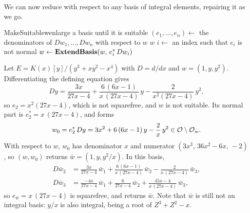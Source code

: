 We can now reduce with respect to any basis of integral elements, repairing it
as we go.

\begin{algo}{MakeSuitable}{w}{enlarge a basis until it is suitable}
\Loop
  \State $(e_1, \dots, e_n) \gets$ the denominators of $Dw_1, \dots, Dw_n$ with respect to $w$
   \Return $w$ \EndIf
  \State $i \gets$ an index such that $e_i$ is not normal
  \State $w \gets \textbf{ExtendBasis}(w,\, e_i^*\, Dw_i)$ 
\EndLoop
\end{algo}

\begin{example}\label{ex:make-suitable}
Let $E = K(x)[y]/(y^3 + x y^2 - x^4)$ with $D = d/dx$ and $w = (1, y, y^2)$.
Differentiating the defining equation gives
\[
  Dy = \frac{3x}{27x - 4} + \frac{6\,(6x - 1)}{x\,(27x - 4)}\, y
       - \frac{2}{x^2 (27x - 4)}\, y^2 ,
\]
so $e_2 = x^2 (27x - 4)$, which is not squarefree, and $w$ is not suitable.
Its normal part is $e_2^* = x\,(27x - 4)$, and  forms
\[
  w_0 = e_2^*\, Dy = 3x^2 + 6\,(6x - 1)\, y - \frac{2}{x}\, y^2
      \in \mathcal{O} \setminus \mathcal{O}_w .
\]
With respect to $w$, $w_0$ has denominator $x$ and numerator $(3x^3,\,
36x^2 - 6x,\, -2)$, so $(w, w_0)$ returns $\bar w = (1, y,
y^2/x)$. In this basis,
\begin{align*}
  D\bar w_2 &= \frac{3x}{27x - 4}\,\bar w_1
               + \frac{6\,(6x - 1)}{x\,(27x - 4)}\,\bar w_2
               - \frac{2}{x\,(27x - 4)}\,\bar w_3 , \\
  D\bar w_3 &= \frac{-4x}{27x - 4}\,\bar w_1
               + \frac{6}{27x - 4}\,\bar w_2
               + \frac{45x - 4}{x\,(27x - 4)}\,\bar w_3 ,
\end{align*}
so $e_{\bar w} = x\,(27x - 4)$ is squarefree, and 
returns $\bar w$. Note that $\bar w$ is still not an integral basis: $y/x$ is
also integral, being a root of $Z^3 + Z^2 - x$.
\end{example}

